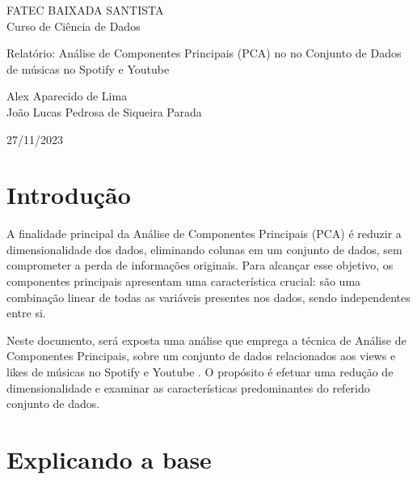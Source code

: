 \documentclass{article}
\begin{document}
\date{} %
\begin{titlepage}
    \begin{center}
        \LARGE FATEC BAIXADA SANTISTA \\ Curso de Ciência de Dados\\
        
        \vspace{8cm}
        
        \LARGE Relatório: Análise de Componentes Principais (PCA) no no Conjunto de Dados de músicas no Spotify e Youtube\\
        
        \vspace{8cm}
        
        \large Alex Aparecido de Lima \\
João Lucas Pedrosa de Siqueira Parada \\


        
        \vspace{2cm}
        
        \large 27/11/2023
    \end{center}
\end{titlepage}
\maketitle


\section{Introdução}

A finalidade principal da Análise de Componentes Principais (PCA) é reduzir a dimensionalidade dos dados, eliminando colunas em um conjunto de dados, sem comprometer a perda de informações originais. Para alcançar esse objetivo, os componentes principais apresentam uma característica crucial: são uma combinação linear de todas as variáveis presentes nos dados, sendo independentes entre si.

Neste documento, será exposta uma análise que emprega a técnica de Análise de Componentes Principais, sobre um conjunto de dados relacionados aos views e likes de músicas no Spotify e Youtube . O propósito é efetuar uma redução de dimensionalidade e examinar as características predominantes do referido conjunto de dados.

\section{Explicando a base}
\end{document}
